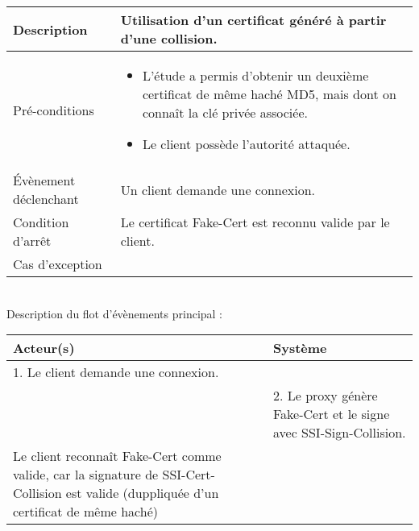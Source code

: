 \begin{tabular}{|>{\columncolor[gray]{.8}}m{4cm}|m{12cm}|}
   \hline
   Description & Utilisation d'un certificat généré à partir d'une collision. \\
   \hline
   Pré-conditions & \begin{itemize}
\item  L'étude a permis d'obtenir un deuxième certificat de même haché MD5, mais dont on connaît la clé privée associée.
  \item Le client possède l'autorité attaquée.
   \end{itemize} \\
   \hline
   Évènement déclenchant & Un client demande une connexion. \\
   \hline
   Condition d'arrêt & Le certificat Fake-Cert est reconnu valide par le client. \\
   \hline
   Cas d'exception  &  \\
   \hline   
\end{tabular}

~\\

Description du flot d'évènements principal :

\begin{tabular}{|m{8cm}|m{8cm}|}
   \hline
  \rowcolor[gray]{.8} Acteur(s) & Système \\
   \hline
   1. Le client demande une connexion. & \\
   \hline
&    2. Le proxy génère Fake-Cert et le signe avec SSI-Sign-Collision.  \\
   \hline
 Le client reconnaît Fake-Cert comme valide, car la signature de SSI-Cert-Collision est valide (duppliquée d'un certificat de même haché) & \\
\hline
\end{tabular}